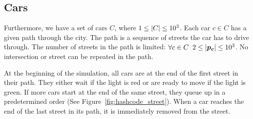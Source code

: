 \subsection{Cars}


Furthermore, we have a set of cars $C$, where $1 \leq \left|{C}\right| \leq 10^3$. Each car $c \in C$ has a given path through the city. The path is a sequence of streets the car has to drive through. The number of streets in the path is limited: $\forall c \in C \;\; 2 \leq \left|{\bm{p_c}}\right| \leq 10^3$. No intersection or street can be repeated in the path.


At the beginning of the simulation, all cars are at the end of the first street in their path. They either wait if the light is red or are ready to move if the light is green. If more cars start at the end of the same street, they queue up in a predetermined order (See Figure~\ref{fig:hashcode_street}). When a car reaches the end of the last street in its path, it is immediately removed from the street.

